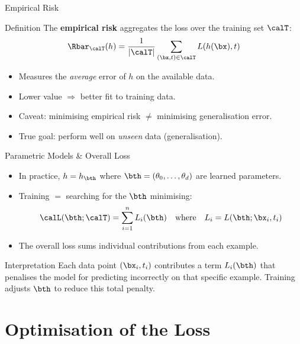 \begin{frame}{Empirical Risk}
  \begin{block}{Definition}
    The \textbf{empirical risk} aggregates the loss over the training set $\calT$:
    \[
      \Rbar_{\calT}(h)
      = \frac{1}{|\calT|}\sum_{(\bx,t)\in\calT} L(h(\bx),t)
    \]
  \end{block}
  \vspace{6pt}
  \begin{itemize}
    \item Measures the \emph{average} error of $h$ on the available data.
    \item Lower value $\Rightarrow$ better fit to training data.
    \item \textcolor{AlertRed}{Caveat:} minimising empirical risk $\neq$ minimising generalisation error.
    \item True goal: perform well on \emph{unseen} data (generalisation).
  \end{itemize}
\end{frame}

\begin{frame}{Parametric Models \& Overall Loss}
  \begin{itemize}
    \item In practice, $h = h_{\bth}$ where $\bth = (\theta_0,\ldots,\theta_d)$ are learned parameters.
    \item Training $=$ searching for the $\bth$ minimising:
      \[
        \calL(\bth;\calT) = \sum_{i=1}^n L_i(\bth)
        \quad\text{where}\quad
        L_i = L(\bth;\bx_i,t_i)
      \]
    \item The overall loss sums individual contributions from each example.
  \end{itemize}
  \begin{exampleblock}{Interpretation}
    Each data point $(\bx_i,t_i)$ contributes a term $L_i(\bth)$ that penalises the model for
    predicting incorrectly on that specific example.
    Training adjusts $\bth$ to reduce this total penalty.
  \end{exampleblock}
\end{frame}

\section{Optimisation of the Loss}

